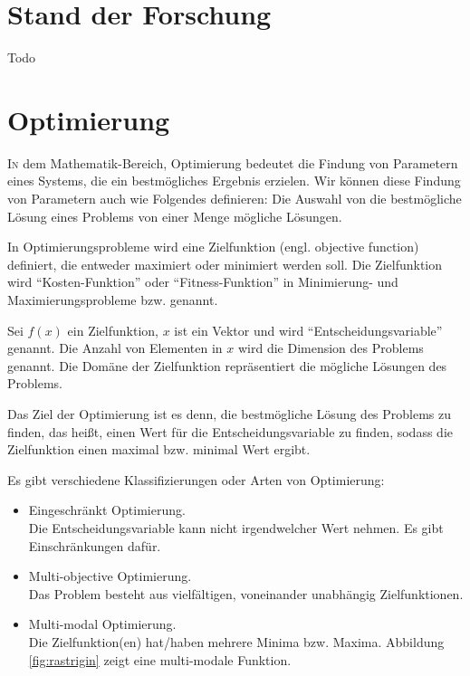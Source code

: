 \documentclass[twoside,twocolumn]{article}
\begin{document}

\section{Stand der Forschung}

Todo


\section{Optimierung}

\lettrine[nindent=0em,lines=3]{I} n dem Mathematik-Bereich, Optimierung bedeutet die Findung von Parametern eines Systems, die ein bestmögliches Ergebnis erzielen. \cite{wiki_optimierung} Wir können diese Findung von Parametern auch wie Folgendes definieren: Die Auswahl von die bestmögliche Lösung eines Problems von einer Menge mögliche Lösungen.\par
In Optimierungsprobleme wird eine Zielfunktion (engl. objective function) definiert, die entweder maximiert oder minimiert werden soll. Die Zielfunktion wird \enquote{Kosten-Funktion} oder \enquote{Fitness-Funktion} in Minimierung- und Maximierungsprobleme bzw. genannt.\par
Sei $f(x)$ ein Zielfunktion, $x$ ist ein Vektor und wird \enquote{Entscheidungsvariable} genannt. Die Anzahl von Elementen in $x$ wird die Dimension des Problems genannt.
Die Domäne der Zielfunktion repräsentiert die mögliche Lösungen des Problems. \par
Das Ziel der Optimierung ist es denn, die bestmögliche Lösung des Problems zu finden, das heißt, einen Wert für die Entscheidungsvariable zu finden, sodass die Zielfunktion einen maximal bzw. minimal Wert ergibt.\par
Es gibt verschiedene Klassifizierungen oder Arten von Optimierung:

\begin{itemize}
\item{Eingeschränkt Optimierung.}\\
Die Entscheidungsvariable kann nicht irgendwelcher Wert nehmen. Es gibt Einschränkungen dafür.\\
\item{Multi-objective Optimierung.}\\
Das Problem besteht aus vielfältigen, voneinander unabhängig Zielfunktionen.\\
\item{Multi-modal Optimierung.}\\
Die Zielfunktion(en) hat/haben mehrere Minima bzw. Maxima. Abbildung \ref{fig:rastrigin} zeigt eine multi-modale Funktion.
\end{itemize}
\end{document}
